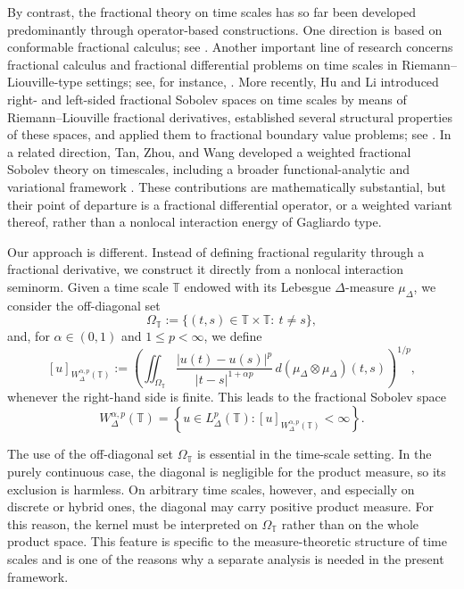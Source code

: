 \documentclass[11pt,a4paper]{article}
\numberwithin{equation}{section}
\theoremstyle{definition}
\newcommand{\T}{\mathbb{T}}
\begin{document}
By contrast, the fractional theory on time scales has so far been developed predominantly through operator-based constructions. One direction is based on conformable fractional calculus; see \cite{BenkhettouHassaniTorres2016,WangZhouLi2016}. Another important line of research concerns fractional calculus and fractional differential problems on time scales in Riemann--Liouville-type settings; see, for instance, \cite{BenkhettouBritoTorres2015,BenkhettouHammoudiTorres2016}. More recently, Hu and Li introduced right- and left-sided fractional Sobolev spaces on time scales by means of Riemann--Liouville fractional derivatives, established several structural properties of these spaces, and applied them to fractional boundary value problems; see \cite{HuLi2022Right,HuLi2022Left,HuLi2022Hindawi}. In a related direction, Tan, Zhou, and Wang developed a weighted fractional Sobolev theory on timescales, including a broader functional-analytic and variational framework \cite{TanZhouWang2025}. These contributions are mathematically substantial, but their point of departure is a fractional differential operator, or a weighted variant thereof, rather than a nonlocal interaction energy of Gagliardo type.

Our approach is different. Instead of defining fractional regularity through a fractional derivative, we construct it directly from a nonlocal interaction seminorm. Given a time scale $\T$ endowed with its Lebesgue $\Delta$-measure $\mu_\Delta$, we consider the off-diagonal set
\[
\Omega_{\T}:=\{(t,s)\in\T\times\T:\ t\neq s\},
\]
and, for $\alpha\in(0,1)$ and $1\le p<\infty$, we define
\[
[u]_{W^{\alpha,p}_{\Delta}(\T)}
:=
\left(
\iint_{\Omega_{\T}}
\frac{|u(t)-u(s)|^p}{|t-s|^{1+\alpha p}}
\,d(\mu_\Delta\otimes\mu_\Delta)(t,s)
\right)^{1/p},
\]
whenever the right-hand side is finite. This leads to the fractional Sobolev space
\[
W^{\alpha,p}_{\Delta}(\T)
=
\left\{
u\in L^p_{\Delta}(\T):
[u]_{W^{\alpha,p}_{\Delta}(\T)}<\infty
\right\}.
\]

The use of the off-diagonal set $\Omega_{\T}$ is essential in the time-scale setting. In the purely continuous case, the diagonal is negligible for the product measure, so its exclusion is harmless. On arbitrary time scales, however, and especially on discrete or hybrid ones, the diagonal may carry positive product measure. For this reason, the kernel must be interpreted on $\Omega_{\T}$ rather than on the whole product space. This feature is specific to the measure-theoretic structure of time scales and is one of the reasons why a separate analysis is needed in the present framework.
\end{document}
